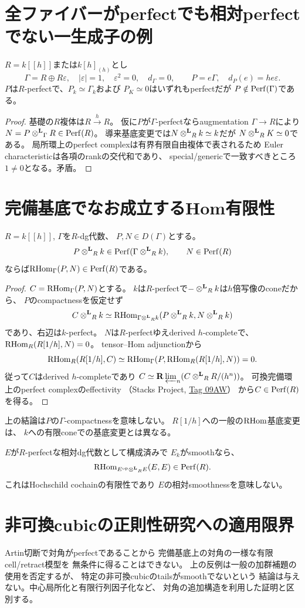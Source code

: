 \section{全ファイバーがperfectでも相対perfectでない一生成子の例}
\begin{proposition}
$R=k[[h]]$または$k[h]_{(h)}$とし
\[
\Gamma=R\oplus R\varepsilon,\quad
|\varepsilon|=1,\quad\varepsilon^2=0,\quad d_\Gamma=0,
\qquad P=e\Gamma,\quad d_P(e)=he\varepsilon.
\]
$P$は$R$-perfectで、$P_k\simeq\Gamma_k$および
$P_K\simeq0$はいずれもperfectだが
$P\notin\operatorname{Perf}(\Gamma)$である。
\end{proposition}
\begin{proof}
基礎の$R$複体は$R\xrightarrow{h}R$。
仮に$P$が$\Gamma$-perfectならaugmentation
$\Gamma\to R$により$N=P\mathbin{\otimes^{\mathbf L}}_\Gamma R\in\operatorname{Perf}(R)$。
導来基底変更では$N\mathbin{\otimes^{\mathbf L}}_Rk\simeq k$だが
$N\mathbin{\otimes^{\mathbf L}}_RK\simeq0$である。
局所環上のperfect complexは有界有限自由複体で表されるため
Euler characteristicは各項のrankの交代和であり、
special/genericで一致すべきところ$1\ne0$となる。矛盾。
\end{proof}

\section{完備基底でなお成立するHom有限性}
\begin{proposition}\label{prop:hom}
$R=k[[h]]$, $\Gamma$を$R$-dg代数、
$P,N\in D(\Gamma)$とする。
\[
P\mathbin{\otimes^{\mathbf L}}_Rk\in\operatorname{Perf}(\Gamma\mathbin{\otimes^{\mathbf L}}_Rk),\qquad
N\in\operatorname{Perf}(R)
\]
ならば$\operatorname{RHom}_\Gamma(P,N)\in\operatorname{Perf}(R)$である。
\end{proposition}
\begin{proof}
$C=\operatorname{RHom}_\Gamma(P,N)$とする。
$k$は$R$-perfectで$-\mathbin{\otimes^{\mathbf L}}_Rk$は$h$倍写像のconeだから、
$P$のcompactnessを仮定せず
\[
C\mathbin{\otimes^{\mathbf L}}_Rk\simeq
\operatorname{RHom}_{\Gamma\mathbin{\otimes^{\mathbf L}}_Rk}(P\mathbin{\otimes^{\mathbf L}}_Rk,N\mathbin{\otimes^{\mathbf L}}_Rk)
\]
であり、右辺は$k$-perfect。
$N$は$R$-perfectゆえderived $h$-completeで、
$\operatorname{RHom}_R(R[1/h],N)=0$。
tensor--Hom adjunctionから
\[
\operatorname{RHom}_R(R[1/h],C)
\simeq\operatorname{RHom}_\Gamma(P,\operatorname{RHom}_R(R[1/h],N))=0.
\]
従って$C$はderived $h$-completeであり
$C\simeq\mathbf R\varprojlim_n(C\mathbin{\otimes^{\mathbf L}}_RR/(h^n))$。
可換完備環上のperfect complexのeffectivity
（Stacks Project, \href{https://stacks.math.columbia.edu/tag/09AW}{Tag 09AW}）
から$C\in\operatorname{Perf}(R)$を得る。
\end{proof}
\begin{remark}
上の結論は$P$の$\Gamma$-compactnessを意味しない。
$R[1/h]$への一般の$\operatorname{RHom}$基底変更は、
$k$への有限coneでの基底変更とは異なる。
\end{remark}
\begin{corollary}
$E$が$R$-perfectな相対dg代数として構成済みで
$E_k$がsmoothなら、
\[
\operatorname{RHom}_{E^{\mathrm{op}}\mathbin{\otimes^{\mathbf L}}_RE}(E,E)\in\operatorname{Perf}(R).
\]
これはHochschild cochainの有限性であり
$E$の相対smoothnessを意味しない。
\end{corollary}

\section{非可換cubicの正則性研究への適用限界}
Artin切断で対角がperfectであることから
完備基底上の対角の一様な有限cell/retract模型を
無条件に得ることはできない。
上の反例は一般の加群補題の使用を否定するが、
特定の非可換cubicのtailsがsmoothでないという
結論は与えない。中心局所化と有限行列因子化など、
対角の追加構造を利用した証明と区別する。

